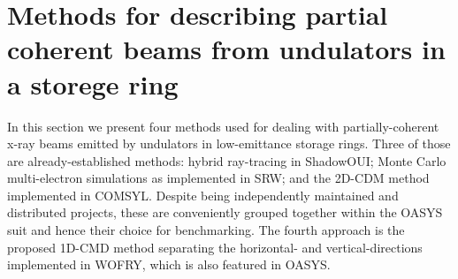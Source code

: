 \documentclass{iucr}              %
\begin{document}



\section{Methods for describing partial coherent beams from undulators in a storege ring}\label{sec:part_coh}
 \newline
In this section we present four methods used for dealing with partially-coherent x-ray beams emitted by undulators in low-emittance storage rings. Three of those are already-established methods:  hybrid ray-tracing in ShadowOUI; Monte Carlo multi-electron simulations as implemented in SRW; and the 2D-CDM method implemented in COMSYL. Despite being independently maintained and distributed projects, these are conveniently grouped together within the OASYS suit \cite{codeOASYS} and hence their choice for benchmarking. The fourth approach is the proposed 1D-CMD method separating the horizontal- and vertical-directions implemented in WOFRY, which is also featured in OASYS.
\end{document}
